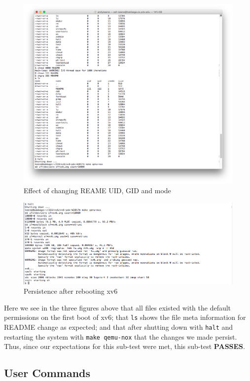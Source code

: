 \documentclass[11pt,letterpaper]{report}
\begin{document}
\pagebreak



\begin{figure}[h!]
\centering
\includegraphics[width=0.8\linewidth]{persistence2.png}
\caption{Effect of changing REAME UID, GID and mode}
\label{fig:datetest}
\end{figure}	



\begin{figure}[h!]
\centering
\includegraphics[width=0.8\linewidth]{persistence3.png}
\caption{Persistence after rebooting xv6}
\label{fig:datetest}
\end{figure}	

\pagebreak

Here we see in the three figures above that all files existed with the default permissions on the first boot of xv6; that {\tt ls} shows the file meta information for README change as expected; and that
after shutting down with {\tt halt} and restarting the system with {\tt make qemu-nox} that the changes we made persist. Thus, since our expectations for this sub-test were met, this 
sub-test \textbf{PASSES}.		 
		 
		
		
		\subsection*{User Commands}
		
\end{document}
